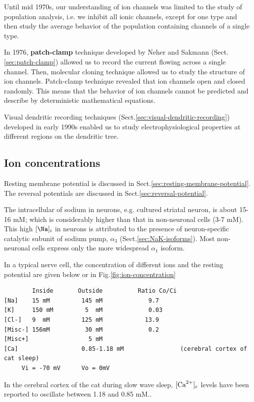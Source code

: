 Until mid 1970s, our understanding of ion channels was limited to the
study of population analysis, i.e. we inhibit all ionic channels,
except for one type and then study the average behavior of the
population containing channels of a single type.

In 1976, {\bf patch-clamp} technique developed by Neher and Sakmann
(Sect.\ref{sec:patch-clamp}) allowed us to record the current flowing across a
single channel. Then, molecular cloning technique allowed us to study the
structure of ion channels.  Patch-clamp technique revealed that ion channels
open and closed randomly. This means that the behavior of ion channels cannot be
predicted and describe by deterministic mathematical equations.

Visual dendritic recording techniques
(Sect.\ref{sec:visual-dendritic-recording}) developed in early 1990s enabled us
to study electrophysiological properties at different regions on the dendritic
tree.


\subsection{Ion concentrations}
\label{sec:ion-concentration-neuron}


Resting membrane potential is discussed in
Sect.\ref{sec:resting-membrane-potential}.
The reversal potentials are discussed in Sect.\ref{sec:reversal-potential}.

The intracellular of sodium in neurons, e.g. cultured striatal neuron, is about
15-16 mM; which is considerably higher than that in non-neuronal cells (3-7 mM).
This high $[\Na]_i$ in neurons is attributed to the presence of neuron-specific
catalytic subunit of sodium pump, $\alpha_3$ (Sect.\ref{sec:NaK-isoforms}). Most
non-neuronal cells express only the more widespread $\alpha_1$ isoform.

In a typical nerve cell, the concentration of different ions 
and the resting potential are
given below or in Fig.\ref{fig:ion-concentration}
\begin{verbatim}
        Inside       Outside          Ratio Co/Ci
[Na]    15 mM         145 mM             9.7
[K]     150 mM         5  mM             0.03
[Cl-]   9  mM         125 mM            13.9
[Misc-] 156mM          30 mM             0.2
[Misc+]                 5 mM
[Ca]                  0.85-1.18 mM                (cerebral cortex of cat sleep)
     Vi = -70 mV      Vo = 0mV                   
\end{verbatim}
In the cerebral cortex of the cat during slow wave sleep, $[{\text{Ca}^{2+}}]_e$ levels
have been reported to oscillate between 1.18 and 0.85 mM.\citep{amzica2002}.

